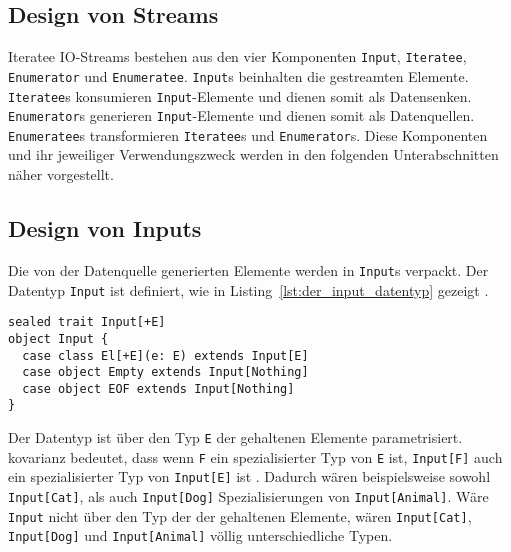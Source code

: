 \subsection{Design von Streams} %
\label{sub:design}

Iteratee IO-Streams bestehen aus den vier Komponenten \lstinline|Input|, \lstinline|Iteratee|, \lstinline|Enumerator| und \lstinline|Enumeratee|.
\lstinline|Input|s beinhalten die gestreamten Elemente.
\lstinline|Iteratee|s konsumieren \lstinline|Input|-Elemente und dienen somit als Datensenken.
\lstinline|Enumerator|s generieren \lstinline|Input|-Elemente und dienen somit als Datenquellen.
\lstinline|Enumeratee|s transformieren \lstinline|Iteratee|s und \lstinline|Enumerator|s.
Diese Komponenten und ihr jeweiliger Verwendungszweck werden in den folgenden Unterabschnitten näher vorgestellt.



\subsection{Design von Inputs} %
\label{sub:design_inputs}

Die von der Datenquelle generierten Elemente werden in \lstinline|Input|s verpackt.
Der Datentyp \lstinline|Input| ist definiert, wie in Listing~\ref{lst:der_input_datentyp} gezeigt \cite[vgl.][Z.~239]{play_iteratee_source_code}.

\begin{lstlisting}[caption=Der Input-Datentyp, label=lst:der_input_datentyp]
sealed trait Input[+E]
object Input {
  case class El[+E](e: E) extends Input[E]
  case object Empty extends Input[Nothing]
  case object EOF extends Input[Nothing]
}
\end{lstlisting}

Der Datentyp ist über den  Typ \lstinline|E| der gehaltenen Elemente parametrisiert.
\gls{kovarianz} bedeutet, dass wenn \lstinline|F| ein spezialisierter Typ von \lstinline|E| ist, \lstinline|Input[F]| auch ein spezialisierter Typ von \lstinline|Input[E]| ist \cite[vgl.][S.~393]{programming_in_scala}.
Dadurch wären beispielsweise sowohl \lstinline|Input[Cat]|, als auch \lstinline|Input[Dog]| Spezialisierungen von \lstinline|Input[Animal]|.
Wäre \lstinline|Input| nicht  über den Typ der der gehaltenen Elemente, wären \lstinline|Input[Cat]|, \lstinline|Input[Dog]| und \lstinline|Input[Animal]| völlig unterschiedliche Typen.

